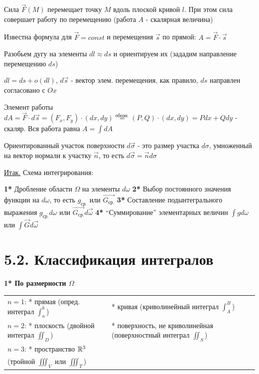 \documentclass[12pt]{article}
\begin{document}
    \Ex Сила $\overrightarrow{F}(M)$ перемещает точку $M$ вдоль плоской кривой $l$. При этом сила совершает работу по перемещению
    (работа $A$ - скалярная величина)

    Известна формула для $\overrightarrow{F} = const$ и перемещения $\overrightarrow{s}$ по прямой: $A = \overrightarrow{F} \cdot \overrightarrow{s}$

    Разобьем дугу на элементы $dl \approx ds$ и ориентируем их (зададим направление перемещению $ds$)

    $dl = ds + o(dl)$, $d\overrightarrow{s}$ - вектор элем. перемещения, как правило, $ds$ направлен согласовано с $Ox$

    Элемент работы $dA = \overrightarrow{F} \cdot d\overrightarrow{s} = (F_x, F_y) \cdot (dx, dy) \stackrel{\text{обозн.}}{=}
    (P, Q) \cdot (dx, dy) = Pdx + Qdy$ - скаляр. Вся работа равна $A = \int dA$

    \Nota Ориентированный участок поверхности $d\overrightarrow{\sigma}$ - это размер участка $d\sigma$, умноженный на вектор нормали к участку $\overrightarrow{n}$,
    то есть $d\overrightarrow{\sigma} = \overrightarrow{n}d\sigma$

    \underline{Итак.} Схема интегрирования:

    \textbf{1*} Дробление области $\Omega$ на элементы $d\omega$
    \textbf{2*} Выбор постоянного значения функции на $d\omega$, то есть $g_{\text{ср.}}$ или $\overrightarrow{G_\text{ср.}}$
    \textbf{3*} Составление подынтегрального выражения $g_{\text{ср.}}d\omega$ или $\overrightarrow{G_\text{ср.}}d\overrightarrow{\omega}$
    \textbf{4*} \enquote{Суммирование} элементарных величин $\int gd\omega$ или $\int \overrightarrow{G}d\overrightarrow{\omega}$


    \section{5.2. Классификация интегралов}

    \textbf{1* По размерности $\Omega$}

    \begin{tabular}{p{8cm}p{8cm}}
        $n = 1$: * прямая (опред. интеграл $\int_a^b$)    & * кривая (криволинейный интеграл $\int_A^B$)                       \\

        $n = 2$: * плоскость (двойной интеграл $\iint_D$) & * поверхность, не криволинейная (поверхностный интеграл $\iint_S$) \\

        $n = 3$: * пространство $\mathbb{R}^3$  \\
        (тройной $\iiint_V$ или $\iiint_T$)

    \end{tabular}
\end{document}
